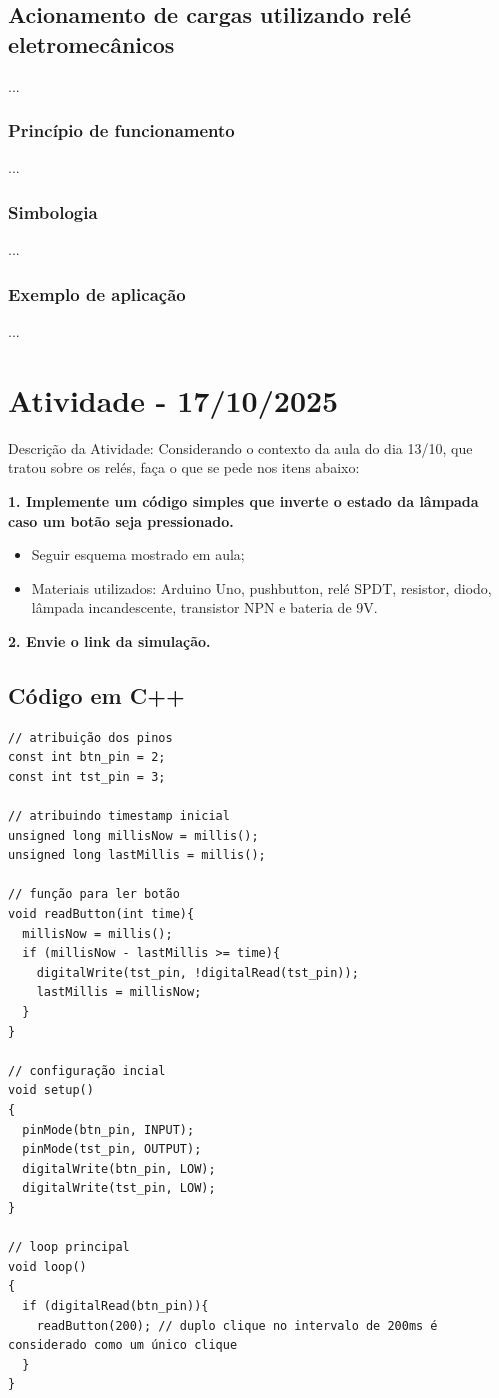 \documentclass{article}
\begin{document}
\subsection{Acionamento de cargas utilizando relé eletromecânicos}
...

\subsubsection{Princípio de funcionamento}
...

\subsubsection{Simbologia}
...

\subsubsection{Exemplo de aplicação}
...


\section{Atividade - 17/10/2025}
Descrição da Atividade: Considerando o contexto da aula do dia 13/10, que tratou sobre os relés, faça o que se pede nos itens abaixo:

\textbf{1. Implemente um código simples que inverte o estado da lâmpada caso um botão seja
pressionado.}
\begin{itemize}
      \item Seguir esquema mostrado em aula;
      \item Materiais utilizados: Arduino Uno, pushbutton, relé SPDT, resistor, diodo, lâmpada incandescente, transistor NPN e bateria de 9V.
\end{itemize}

\textbf{2. Envie o link da simulação.}

\subsection{Código em C++}
\begin{verbatim}
// atribuição dos pinos
const int btn_pin = 2;
const int tst_pin = 3;

// atribuindo timestamp inicial
unsigned long millisNow = millis();
unsigned long lastMillis = millis();

// função para ler botão
void readButton(int time){
  millisNow = millis();
  if (millisNow - lastMillis >= time){
  	digitalWrite(tst_pin, !digitalRead(tst_pin));
    lastMillis = millisNow;
  }
}

// configuração incial
void setup()
{
  pinMode(btn_pin, INPUT);
  pinMode(tst_pin, OUTPUT);
  digitalWrite(btn_pin, LOW);
  digitalWrite(tst_pin, LOW);
}

// loop principal
void loop()
{
  if (digitalRead(btn_pin)){
    readButton(200); // duplo clique no intervalo de 200ms é considerado como um único clique
  }
}
\end{verbatim}
\end{document}
